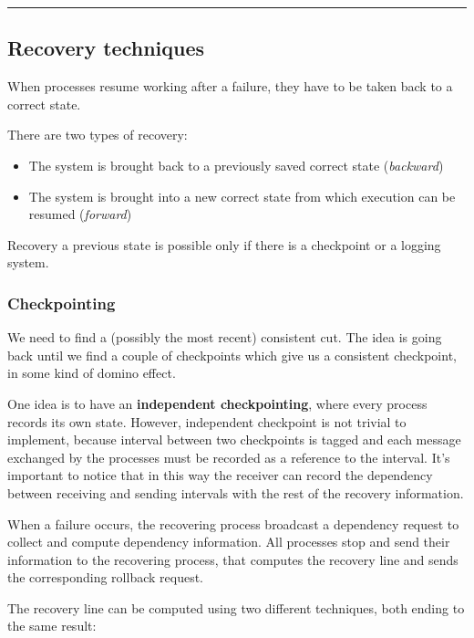 \begin{center}\rule{3in}{0.4pt}\end{center}

\subsection{Recovery techniques}\label{recovery-techniques}

When processes resume working after a failure, they have to be taken
back to a correct state.

There are two types of recovery:

\begin{itemize}
\itemsep1pt\parskip0pt
\item
  The system is brought back to a previously saved correct state
  (\emph{backward})
\item
  The system is brought into a new correct state from which execution
  can be resumed (\emph{forward})
\end{itemize}
Recovery a previous state is possible only if there is a checkpoint or a
logging system.

\subsubsection{Checkpointing}\label{checkpointing}

We need to find a (possibly the most recent) consistent cut. The idea is
going back until we find a couple of checkpoints which give us a
consistent checkpoint, in some kind of domino effect.

One idea is to have an \textbf{independent checkpointing}, where every
process records its own state. However, independent checkpoint is not
trivial to implement, because interval between two checkpoints is tagged
and each message exchanged by the processes must be recorded as a reference
to the interval. It's important to notice that in this way the receiver
can record the dependency between receiving and sending intervals with
the rest of the recovery information.

When a failure occurs, the recovering process broadcast a dependency
request to collect and compute dependency information. All processes
stop and send their information to the recovering process, that computes
the recovery line and sends the corresponding rollback request.

The recovery line can be computed using two different techniques, both
ending to the same result:

